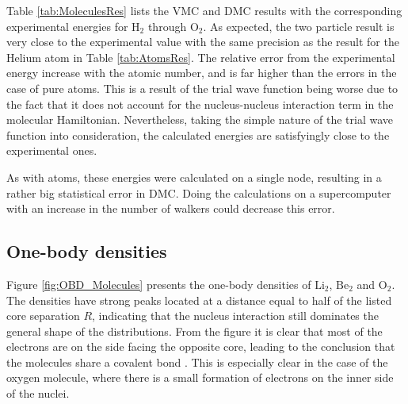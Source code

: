 Table \ref{tab:MoleculesRes} lists the VMC and DMC results with the corresponding experimental energies for $\mathrm{H_2}$ through $\mathrm{O_2}$. As expected, the two particle result is very close to the experimental value with the same precision as the result for the Helium atom in Table \ref{tab:AtomsRes}. The relative error from the experimental energy increase with the atomic number, and is far higher than the errors in the case of pure atoms. This is a result of the trial wave function being worse due to the fact that it does not account for the nucleus-nucleus interaction term in the molecular Hamiltonian. Nevertheless, taking the simple nature of the trial wave function into consideration, the calculated energies are satisfyingly close to the experimental ones. 

As with atoms, these energies were calculated on a single node, resulting in a rather big statistical error in DMC. Doing the calculations on a supercomputer with an increase in the number of walkers could decrease this error.

\subsection{One-body densities}

Figure \ref{fig:OBD_Molecules} presents the one-body densities of $\mathrm{Li_2}$, $\mathrm{Be_2}$ and $\mathrm{O_2}$. The densities have strong peaks located at a distance equal to half of the listed core separation $R$, indicating that the nucleus interaction still dominates the general shape of the distributions. From the figure it is clear that most of the electrons are on the side facing the opposite core, leading to the conclusion that the molecules share a covalent bond \cite{UniversityPhysics}. This is especially clear in the case of the oxygen molecule, where there is a small formation of electrons on the inner side of the nuclei.

